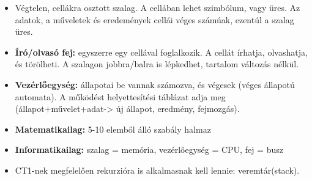 \documentclass[11pt,a4paper]{article}
\begin{document}
            \begin{tcolorbox}[colback=blue!5!white,colframe=blue!50!black,title= 3. Ismertesse a Turing-gép felépítését és működését!]
            \begin{itemize}
                \item Végtelen, cellákra osztott szalag. A cellában lehet szimbólum, vagy üres. Az adatok, a műveletek és eredemények cellái véges számúak, ezentúl a szalag üres.
                \item \textbf{Író/olvasó fej:} egyszerre egy cellával foglalkozik. A cellát írhatja, olvashatja, és törölheti. A szalagon jobbra/balra is lépkedhet, tartalom változás nélkül.
                \item \textbf{Vezérlőegység:} állapotai be vannak számozva, és végesek (véges állapotú automata). A működést helyettesítési táblázat adja meg (állapot+művelet+adat-> új állapot, eredmény, fejmozgás).
                \item \textbf{Matematikailag:} 5-10 elemből álló szabály halmaz
                \item \textbf{Informatikailag:} szalag = memória, vezérlőegység = CPU, fej = busz
                \item CT1-nek megfelelően rekurzióra is alkalmasnak kell lennie: veremtár(stack).
            \end{itemize}
            \begin{center}
            \end{center}
            \end{tcolorbox}
\end{document}
